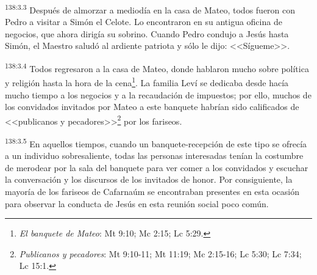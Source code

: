 \par 
\textsuperscript{138:3.3} Después de almorzar a mediodía en la casa de Mateo, todos fueron con Pedro a visitar a Simón el Celote. Lo encontraron en su antigua oficina de negocios, que ahora dirigía su sobrino. Cuando Pedro condujo a Jesús hasta Simón, el Maestro saludó al ardiente patriota y sólo le dijo: <<Sígueme>>.

\par 
\textsuperscript{138:3.4} Todos regresaron a la casa de Mateo, donde hablaron mucho sobre política y religión hasta la hora de la cena\footnote{\textit{El banquete de Mateo}: Mt 9:10; Mc 2:15; Lc 5:29.}. La familia Leví se dedicaba desde hacía mucho tiempo a los negocios y a la recaudación de impuestos; por ello, muchos de los convidados invitados por Mateo a este banquete habrían sido calificados de <<publicanos y pecadores>>\footnote{\textit{Publicanos y pecadores}: Mt 9:10-11; Mt 11:19; Mc 2:15-16; Lc 5:30; Lc 7:34; Lc 15:1.} por los fariseos.

\par 
\textsuperscript{138:3.5} En aquellos tiempos, cuando un banquete-recepción de este tipo se ofrecía a un individuo sobresaliente, todas las personas interesadas tenían la costumbre de merodear por la sala del banquete para ver comer a los convidados y escuchar la conversación y los discursos de los invitados de honor. Por consiguiente, la mayoría de los fariseos de Cafarnaúm se encontraban presentes en esta ocasión para observar la conducta de Jesús en esta reunión social poco común.

